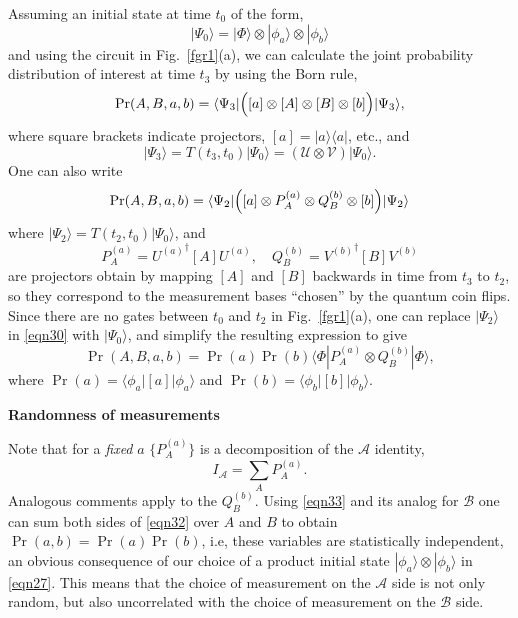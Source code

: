 \documentclass[12pt]{article} %
\def\outl#1{\par{\medskip\noindent\hspace*{.5cm}\bf
      \mathversion{bold}#1\mathversion{normal}\smallskip} }
\def\np{} \def\xa{} \def\xb{} \def\xn{} \def\xp{}
\def\outl#1{} \def\np{} \def\xa{} \def\xb{} \def\xn{} \def\xp{}
\def\outl#1{\par{\medskip\noindent\hspace*{.5cm}\bf
      \mathversion{bold}#1\mathversion{normal}\smallskip} }
\def\np{\newpage }\def\xn{\nopagebreak }\def\xp{\pagebreak }
\newcommand{\ad}{^\dagger }
\newcommand{\Blp}{\Bigl(}
\newcommand{\Brp}{\Bigr)}
\newcommand{\dya}[1]{|#1\rgl\lgl#1|}
\newcommand{\ket}[1]{|#1\rgl }
\newcommand{\lgl}{\langle }
\newcommand{\mte}[2]{\lgl#1|#2|#1\rgl }
\newcommand{\ot}{\otimes }
\newcommand{\rgl}{\rangle }
\newcommand{\AM}{{\mathcal A}}
\newcommand{\BM}{{\mathcal B}}
\newcommand{\UM}{{\mathcal U}}
\newcommand{\VM}{{\mathcal V}}
\begin{document}
Assuming an initial state at time $t_0$ of the form, 
\begin{equation}
  \ket{\Psi_0} = \ket{\Phi}\ot\ket{\phi_a}\ot\ket{\phi_b}
\label{eqn27}
\end{equation}
and using the circuit in Fig.~\ref{fgr1}(a), we can calculate the joint
probability distribution of interest at time $t_3$ by using the Born rule,
\begin{equation}
  \Pr(A,B,a,b) = \mte{\Psi_3}{\Blp [a]\ot[A]\ot[B]\ot[b] \Brp},
\label{eqn28}
\end{equation}
where square brackets indicate projectors, $[a]=\dya{a}$, etc., and
\begin{equation}
  \ket{\Psi_3} = T(t_3,t_0) \ket{\Psi_0} = (\UM\ot\VM) \ket{\Psi_0}.
\label{eqn29}
\end{equation}
One can also write 
\begin{equation}
  \Pr(A,B,a,b) = \mte{\Psi_2}{\Blp [a]\ot P^{(a)}_A\ot Q^{(b)}_B\ot[b]\Brp}
\label{eqn30}
\end{equation}
where $\ket{\Psi_2}=T(t_2,t_0)\ket{\Psi_0}$, and
\begin{equation}
  P^{(a)}_A = {U^{(a)}}\ad [A] U^{(a)},\quad 
 Q^{(b)}_B = {V^{(b)}}\ad [B] V^{(b)}
\label{eqn31}
\end{equation}
are projectors obtain by mapping $[A]$ and $[B]$ backwards in time from $t_3$
to $t_2$, so they correspond to the measurement bases ``chosen'' by the
quantum coin flips.  Since there are no gates between $t_0$ and $t_2$ in
Fig.~\ref{fgr1}(a), one can replace $\ket{\Psi_2}$ in \eqref{eqn30} with
$\ket{\Psi_0}$, and simplify the resulting expression to give
\begin{equation}
  \Pr(A,B,a,b) = \Pr(a)\Pr(b) \mte{\Phi}{P^{(a)}_A\ot Q^{(b)}_B},
\label{eqn32}
\end{equation}
where $\Pr(a)=\mte{\phi_a}{[a]}$ and $\Pr(b)=\mte{\phi_b}{[b]}$.

\xb
\outl{Randomness of measurements}
\xa


Note that for a
\emph{fixed} $a$ $\{P^{(a)}_A\}$ is a decomposition of the $\AM$
identity, 
\begin{equation}
  I_\AM = \sum_A P^{(a)}_A.
\label{eqn33}
\end{equation}
Analogous comments apply to the $Q^{(b)}_B$.  Using \eqref{eqn33} and its
analog for $\BM$ one can sum both sides of \eqref{eqn32} over $A$ and $B$ to
obtain $\Pr(a,b)=\Pr(a)\Pr(b)$, i.e, these variables are statistically
independent, an obvious consequence of our choice of a product initial state
$\ket{\phi_a}\ot\ket{\phi_b}$ in \eqref{eqn27}.  This means that the choice of
measurement on the $\AM$ side is not only random, but also uncorrelated with
the choice of measurement on the $\BM$ side.
\end{document}
